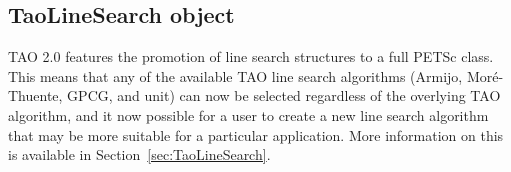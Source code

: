 \subsection{TaoLineSearch object}
TAO 2.0 features the promotion of line search structures to a full PETSc 
class. This means that any of the available TAO line search algorithms (Armijo, 
Mor\'e-Thuente, GPCG, and unit) can now be selected regardless of the 
overlying TAO algorithm, and it now possible
for a user to create a new line search algorithm that may be more suitable 
for a particular application.  More information on this is available in
Section~\ref{sec:TaoLineSearch}.

\begin{comment}
\section{Performance Results}

A major concern in the TAO project is the performance and scalability
of optimization algorithms on large problems.  In this section we
focus on the GPCG (gradient projection, conjugate gradient) algorithm
for the solution of bound-constrained convex quadratic programming
problems.  Originally developed by Mor\'e and Toraldo
\cite{more-toraldo}, the GPCG algorithm was designed for large-scale
problems but had only been implemented for a single processor.  GPCG
combines the advantages of the identification properties of the
gradient projection method with the finite termination properties of
the conjugate gradient method.  Moreover, the performance of the
TAO implementation on large optimization problems is noteworthy.


\begin{figure}[tb]
\centerline{\epsfysize=3.0in \epsfbox{pjb.eps}}
\caption{The journal bearing problem with $\epsilon$ = 0.9}
\label{dpjb}
\end{figure}



We illustrate the performance of the GPCG algorithm by 
presenting results for a journal bearing problem
with over 2.5 million variables.
The journal bearing problem
is a finite element approximation to a variational problem 
over a rectangular two-dimensional grid.  A
grid with $1600$ points in each direction, for example, is formulated
as a bound constrained quadratic problem with $1600^2=2,560,000$
variables.
The triangulation of the grid results in a matrix that has the
usual five diagonal nonzero structure that arises
from a difference approximation to the Laplacian operator.
The journal bearing problem contains an eccentricity parameter,
$\varepsilon \in (0,1)$, that influences the number of active
variables at the solution and the difficulty in solving it.
Figure \ref{dpjb} shows the solution of the journal bearing problem
for $ \varepsilon = 0.9 $. The steep gradient in the solution
makes this problem a difficult benchmark.


\end{comment}
